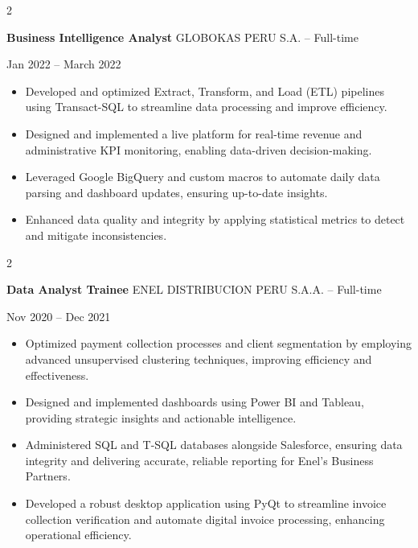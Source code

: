 \documentclass[10pt, letterpaper]{article}
\newenvironment{highlights}{
    \begin{itemize}[
        topsep=0.10 cm,
        parsep=0.10 cm,
        partopsep=0pt,
        itemsep=0pt,
        leftmargin=0 cm + 10pt
    ]
}{
    \end{itemize}
} %
\newenvironment{twocolentry}[2][]{
    \onecolentry
    \def\secondColumn{#2}
    \setcolumnwidth{\fill, 4.5 cm}
    \begin{paracol}{2}
}{
    \switchcolumn \raggedleft \secondColumn
    \end{paracol}
    \endonecolentry
} %
\begin{document}
\begin{twocolentry}{Jan 2022 – March 2022}
    \textbf{Business Intelligence Analyst}  \textbar 
    GLOBOKAS PERU S.A. – Full-time
\end{twocolentry}
\begin{highlights}
\item Developed and optimized Extract, Transform, and Load (ETL) pipelines using Transact-SQL to streamline data processing and improve efficiency.  
\item Designed and implemented a live platform for real-time revenue and administrative KPI monitoring, enabling data-driven decision-making.  
\item Leveraged Google BigQuery and custom macros to automate daily data parsing and dashboard updates, ensuring up-to-date insights.  
\item Enhanced data quality and integrity by applying statistical metrics to detect and mitigate inconsistencies.  
\end{highlights}



\vspace{0.3cm}




\begin{twocolentry}{Nov 2020 – Dec 2021}
    \textbf{Data Analyst Trainee} \textbar ENEL DISTRIBUCION PERU S.A.A. – Full-time
\end{twocolentry}
\begin{highlights}
    \item Optimized payment collection processes and client segmentation by employing advanced unsupervised clustering techniques, improving efficiency and effectiveness.
    \item Designed and implemented dashboards using Power BI and Tableau, providing strategic insights and actionable intelligence.
    \item Administered SQL and T-SQL databases alongside Salesforce, ensuring data integrity and delivering accurate, reliable reporting for Enel's Business Partners.
    \item Developed a robust desktop application using PyQt to streamline invoice collection verification and automate digital invoice processing, enhancing operational efficiency.
\end{highlights}

\vspace{0.3cm}
\end{document}
